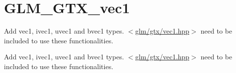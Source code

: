 \hypertarget{group__gtx__vec1}{\section{G\-L\-M\-\_\-\-G\-T\-X\-\_\-vec1}
\label{group__gtx__vec1}
}


Add vec1, ivec1, uvec1 and bvec1 types. $<$\hyperlink{vec1_8hpp}{glm/gtx/vec1.\-hpp}$>$ need to be included to use these functionalities.  


Add vec1, ivec1, uvec1 and bvec1 types. $<$\hyperlink{vec1_8hpp}{glm/gtx/vec1.\-hpp}$>$ need to be included to use these functionalities. 